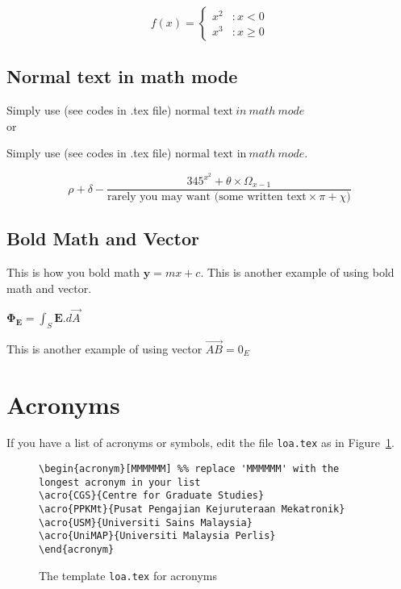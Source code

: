 \begin{equation}
	f(x) = \left\{
	\begin{array}{lr}
	x^2 &: x < 0\\
	x^3 &: x \ge 0
	\end{array}
	\right.
\end{equation}

\subsection{Normal text in math mode~~}  
Simply use (see codes in .tex file) $\textrm{normal text}~in~math~mode$ \\or

Simply use (see codes in .tex file) $\text{normal text in}~math~mode$. 

\begin{equation}
\rho + \delta - \frac{345^{x^2 } + \theta \times \Omega_{x-1}}{\textrm{rarely you may want (some written text} \times \pi + \chi)}
\label{howtomakeanumberedequation2}
\end{equation}

\subsection{Bold Math and Vector}
This is how you bold math $\boldsymbol{y}=mx+c$. This is another example of using bold math and vector. 
\begin{center}
	$\boldsymbol{\Phi_E}=\int _{ S }\textbf{E}.d\vec{A} $
\end{center} 

This is another example of using vector $\overrightarrow{AB} = 0_E$

\section{Acronyms}
\acresetall
If you have a list of acronyms or symbols, edit the file \verb|loa.tex| as in Figure~\ref{fig:acronym}.

\begin{figure}[hbt!]
\begin{lstlisting}
\begin{acronym}[MMMMMM] %% replace 'MMMMMM' with the longest acronym in your list
\acro{CGS}{Centre for Graduate Studies}
\acro{PPKMt}{Pusat Pengajian Kejuruteraan Mekatronik}
\acro{USM}{Universiti Sains Malaysia}
\acro{UniMAP}{Universiti Malaysia Perlis}
\end{acronym}
\end{lstlisting}
\caption{The template \texttt{loa.tex} for acronyms}\label{fig:acronym}
\end{figure}

